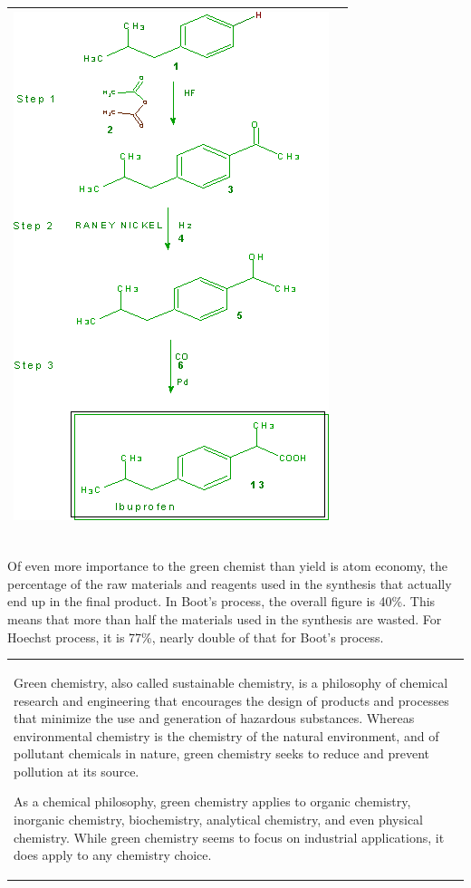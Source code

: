 \documentclass[pdftex,11pt,a4paper]{article}
\begin{document}
\begin{tabular}{|p{235pt}|p{175pt}|}
\includegraphics[clip=true,trim=0pt 0pt 0pt 0pt,scale=0.5]{ib1.png}\\
\hline
\end{tabular}
\\

Of even more importance to the green chemist than yield is atom economy, the
percentage of the raw materials and reagents used in the synthesis that actually end
up in the final product. In Boot's process, the overall figure is 40\%. This means that more than half the materials used in the
synthesis are wasted. For Hoechst process, it is 77\%, nearly double of that for Boot's process.\\

\hspace{-15pt}\begin{tabular}{p{405pt}}
\rowcolor{Gray} \vspace{-5pt} Green chemistry, also called sustainable chemistry, is a philosophy of chemical research and engineering that encourages the design of products and processes that minimize the use and generation of hazardous substances. Whereas environmental chemistry is the chemistry of the natural environment, and of pollutant chemicals in nature, green chemistry seeks to reduce and prevent pollution at its source.

As a chemical philosophy, green chemistry applies to organic chemistry, inorganic chemistry, biochemistry, analytical chemistry, and even physical chemistry. While green chemistry seems to focus on industrial applications, it does apply to any chemistry choice. 
\vspace{5pt}
\end{tabular}
\end{document}
